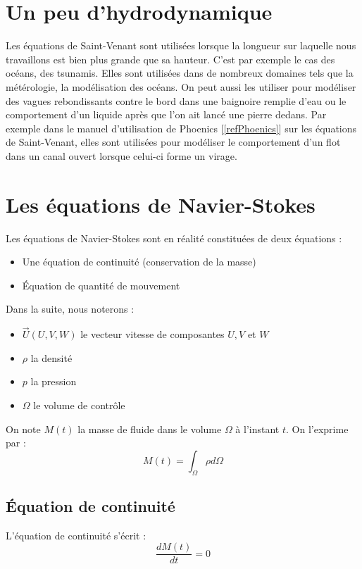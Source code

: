 
\section{Un peu d'hydrodynamique}
Les équations de Saint-Venant sont utilisées lorsque la longueur sur laquelle nous travaillons est bien plus grande que sa hauteur. C'est par exemple le cas des océans, des tsunamis. Elles sont utilisées dans de nombreux domaines tels que la métérologie, la modélisation des océans. On peut aussi les utiliser pour modéliser des vagues rebondissants contre le bord dans une baignoire remplie d'eau ou le comportement d'un liquide après que l'on ait lancé une pierre dedans. Par exemple dans le manuel d'utilisation de Phoenics [\ref{refPhoenics}] sur les équations de Saint-Venant, elles sont utilisées pour modéliser le comportement d'un flot dans un canal ouvert lorsque celui-ci forme un virage.
\section{Les équations de Navier-Stokes}
Les équations de Navier-Stokes sont en réalité constituées de deux équations :
\begin{itemize}
	\item Une équation de continuité (conservation de la masse)
	\item Équation de quantité de mouvement
\end{itemize}

\bigskip
Dans la suite, nous noterons :
\begin{itemize}
	\item $\overrightarrow{U}(U,V,W)$ le vecteur vitesse de composantes $U, V$ et $W$
	\item $\rho$ la densité
	\item $p$ la pression
	\item $\Omega$ le volume de contrôle
\end{itemize}

\bigskip
On note $M(t)$ la masse de fluide dans le volume $\Omega$ à l'instant $t$. On l'exprime par :
	\begin{equation} \label{II-2} M(t)=\int_{\Omega} \rho d\Omega \end{equation}

	\subsection{Équation de continuité}
L'équation de continuité s'écrit :
	\begin{equation} \label{II-2-1-1} \frac{d M(t)}{dt}=0 \end{equation}

